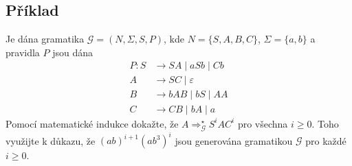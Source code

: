 \subsection{Příklad}
Je dána gramatika $\mathcal{G} = (N, \Sigma, S, P)$, kde $N = \{S, A, B, C\}$, $\Sigma = \{a,b\}$ a pravidla $P$ jsou dána
\begin{align*}
    P: S &\rightarrow SA \mid aSb \mid Cb\\
    A &\rightarrow SC \mid \varepsilon\\
    B &\rightarrow bAB \mid bS \mid AA\\
    C &\rightarrow CB \mid bA \mid a
\end{align*}
Pomocí matematické indukce dokažte, že $A \Rightarrow_\mathcal{G}^\star S^i A C^i$ pro všechna $i \geq 0$. Toho využijte k důkazu, že $(ab)^{i+1} (ab^3)^i$ jsou generována gramatikou $\mathcal{G}$ pro každé $i \geq 0$.